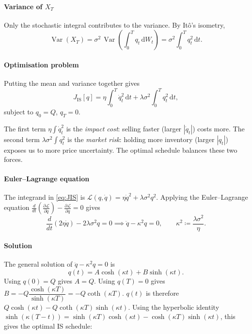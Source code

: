 \documentclass[12pt, a4paper]{article}
\newcommand{\Var}{\operatorname{Var}}
\newcommand{\dd}{\,\mathrm{d}}
\newcommand{\kap}{\kappa}
\begin{document}
\paragraph{Variance of \texorpdfstring{$X_T$}{XT}}

Only the stochastic integral contributes to the variance.
By It\^{o}'s isometry,
\[
  \Var(X_T)
  = \sigma^2\,\Var\!\left(\int_0^T q_t \dd W_t\right)
  = \sigma^2\!\int_0^T q_t^2 \dd t.
\]

\paragraph{Optimisation problem}

Putting the mean and variance together gives
\begin{equation}
  J_{\mathrm{IS}}[q]
  = \eta\!\int_0^T \dot q_t^2 \dd t + \lambda\sigma^2\!\int_0^T q_t^2 \dd t,
  \label{eq:JIS}
\end{equation}
subject to $q_0 = Q$, $q_T = 0$.

\begin{notebox}
  The first term $\eta\int\dot q_t^2$ is the \emph{impact cost}: selling faster
  (larger $|\dot q_t|$) costs more. The second term $\lambda\sigma^2\int q_t^2$
  is the \emph{market risk}: holding more inventory (larger $|q_t|$) exposes us to
  more price uncertainty. The optimal schedule balances these two forces.
\end{notebox}

\paragraph{Euler--Lagrange equation}

The integrand in \eqref{eq:JIS} is $\mathcal{L}(q, \dot q) = \eta\dot q^2 + \lambda\sigma^2 q^2$.
Applying the Euler--Lagrange equation
$\frac{d}{dt}\!\left(\frac{\partial\mathcal{L}}{\partial\dot q}\right)
 - \frac{\partial\mathcal{L}}{\partial q} = 0$
gives
\[
  \frac{d}{dt}(2\eta\dot q) - 2\lambda\sigma^2 q = 0
  \implies
  \ddot q - \kap^2 q = 0,
  \qquad \kap^2 \coloneqq \frac{\lambda\sigma^2}{\eta}.
\]

\paragraph{Solution}

The general solution of $\ddot q - \kap^2 q = 0$ is
\[
  q(t) = A\cosh(\kap t) + B\sinh(\kap t).
\]
Using $q(0) = Q$ gives $A = Q$.
Using $q(T) = 0$ gives
$B = -Q\dfrac{\cosh(\kap T)}{\sinh(\kap T)} = -Q\coth(\kap T)$.
$q(t)$ is therefore $Q\cosh(\kap t) - Q\coth(\kap T)\sinh(\kap t)$.
Using the hyperbolic identity
$\sinh(\kap(T-t)) = \sinh(\kap T)\cosh(\kap t) - \cosh(\kap T)\sinh(\kap t)$,
this gives the optimal IS schedule:
\end{document}

